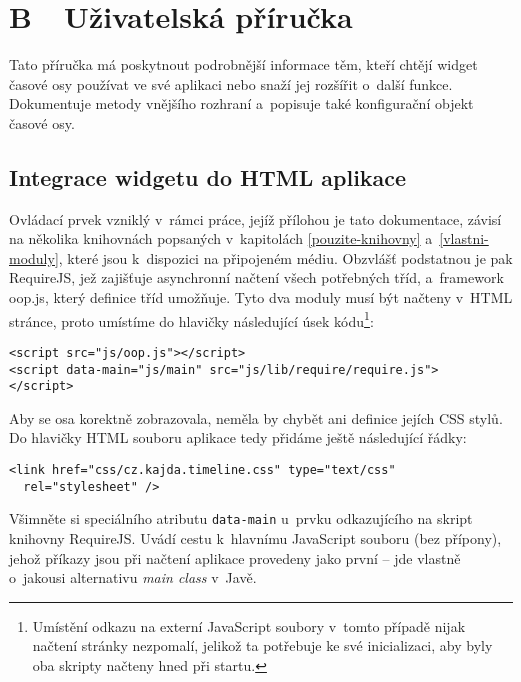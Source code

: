 \pagestyle{empty}
\chapter*{B\ \ Uživatelská příručka}   %
	\thispagestyle{empty}   %
	Tato příručka má poskytnout podrobnější informace těm, kteří chtějí widget časové osy používat ve své aplikaci nebo snaží jej rozšířit o~další funkce. Dokumentuje metody vnějšího rozhraní a~popisuje také konfigurační objekt časové osy.
	
	\section*{Integrace widgetu do HTML aplikace}
	Ovládací prvek vzniklý v~rámci práce, jejíž přílohou je tato dokumentace, závisí na několika knihovnách popsaných v~kapitolách \ref{pouzite-knihovny} a~\ref{vlastni-moduly}, které jsou k~dispozici na připojeném médiu. Obzvlášť podstatnou je pak {\sf RequireJS}, jež zajišťuje asynchronní načtení všech potřebných tříd, a~framework {\sf oop.js}, který definice tříd umožňuje. Tyto dva moduly musí být načteny v~HTML stránce, proto umístíme do hlavičky následující úsek kódu\footnote{Umístění odkazu na externí JavaScript soubory v~tomto případě nijak načtení stránky nezpomalí, jelikož ta potřebuje ke své inicializaci, aby byly oba skripty načteny hned při startu.}: 
	{\small\begin{verbatim}
<script src="js/oop.js"></script>
<script data-main="js/main" src="js/lib/require/require.js">
</script>
	\end{verbatim}}
	Aby se osa korektně zobrazovala, neměla by chybět ani definice jejích CSS stylů. Do hlavičky HTML souboru aplikace tedy přidáme ještě následující řádky:
	{\small\begin{verbatim}
<link href="css/cz.kajda.timeline.css" type="text/css"
  rel="stylesheet" />
	\end{verbatim}}
	
	Všimněte si speciálního atributu {\tt data-main} u~prvku odkazujícího na skript knihovny {\sf RequireJS}. Uvádí cestu k~hlavnímu JavaScript souboru (bez přípony), jehož příkazy jsou při načtení aplikace provedeny jako první -- jde vlastně o~jakousi alternativu \emph{main class} v~Javě.
	
